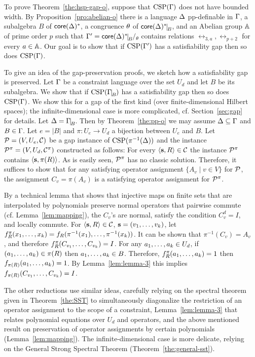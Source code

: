 \documentclass[11pt,letter]{article}
\begin{document}
To prove Theorem~\ref{the:hsp-gap-o}, suppose that ${\rm CSP}(\Gamma)$ does not have
bounded width. 
By Proposition~\ref{pro:abelian-o} there is 
a language $\Delta$ pp-definable in $\Gamma$, a subalgebra $B$ of $\mathsf{core}(\Delta)^*$, a congruence
$\theta$ of $\core(\Dl)^*\red B$, and an Abelian group ${\mathbb A}$ of prime order $p$
such that $\Gm'=\core(\Dl)^*\red B\fac\th$ contains relations $\rel_{3,a},\rel_{p+2}$
for every $a\in{\mathbb A}$.
Our goal is to show that if ${\rm CSP}(\Gamma')$ has a satisfiability gap
then so does ${\rm CSP}(\Gamma)$. 


To give an idea of the gap-preservation proofs, we sketch how a satisfiability
gap is preserved.
Let $\Gamma$ be a constraint language over the set $U_d$ and let $B$ be its subalgebra.
We show that if $\CSP(\Gm\red B)$ has a satisfiability gap then so does
${\rm CSP}(\Gamma)$. We show this for a gap of the first kind (over finite-dimensional Hilbert spaces); the infinite-dimensional case is more complicated, cf. Section~\ref{sec:gap} for details.
Let $\Dl=\Gm\red B$. Then by Theorem~\ref{the:pp-o} we may assume $\Delta\subseteq\Gamma$ and $B\in\Gamma$. Let $e=|B|$ and $\pi:U_e\to U_d$ a bijection between $U_e$ and $B$. 
Let ${\mathcal P}=(V,U_e,{\mathcal C})$ be a gap instance of ${\rm CSP}(\pi^{-1}(\Delta))$ and the instance ${\mathcal P}^\pi=(V,U_d,{\mathcal C}^\pi)$ constructed as follows: For every $\langle {\bf s},R \rangle\in{\mathcal C}$ the instance ${\mathcal P}^\pi$ contains $\langle {\bf s},\pi(R) \rangle$. As is easily seen, ${\mathcal P}^\pi$ has no classic solution. Therefore, it suffices to show that for any satisfying operator assignment $\{A_v\mid v\in V\}$ for ${\mathcal P}$, the assignment $C_v=\pi(A_v)$ is a satisfying operator assignment for ${\mathcal P}^\pi$.

By a technical lemma that shows that injective maps on finite sets that are interpolated
by polynomials preserve normal operators that pairwise commute (cf.
Lemma~\ref{lem:mapping}), 
the $C_v$'s are normal, satisfy the condition $C_v^d=I$, and locally commute. For $\langle {\bf s},R \rangle\in{\mathcal C}$, ${\bf s}=(v _1,\ldots, v _{k})$, let $f^\pi_R(x _1,\ldots, x _{k})=f_R(\pi^{-1}(x_1),\ldots,\pi^{-1}(x_k))$. 
It can be shown that $\pi^{-1}(C_v)=A_v$, and therefore $f^\pi_R(C_{v_1},\ldots, C_{v_k})=I$. For any $a _1,\ldots, a _{k}\in U_d$, if $(a _1,\ldots, a _{k})\in\pi(R)$ then $a _1,\ldots, a _{k}\in B$. Therefore, $f^\pi_R(a _1,\ldots, a _{k})=1$ then $f_{\pi(R)}(a _1,\ldots, a _{k})=1$. By Lemma~\ref{lem:lemma-3} this implies $f_{\pi(R)}(C_{v_1},\ldots, C_{v_k})=I$.


The other reductions use similar ideas, carefully relying on the spectral
theorem given in Theorem~\ref{the:SST} to simultaneously diagonalize the
restriction of an operator assignment to the scope of a constraint,
Lemma~\ref{lem:lemma-3} that relates polynomial equations over $U_d$ and
operators, and the above mentioned result on
preservation of operator assignments by certain polynomials (Lemma~\ref{lem:mapping}).
The infinite-dimensional case is more delicate, relying on the General Strong
Spectral Theorem (Theorem~\ref{the:general-sst}).
\end{document}
